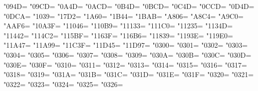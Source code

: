 
\newXeTeXintercharclass\KclassCM
\newXeTeXintercharclass\KclassVir

\XeTeXcharclass"094D=\KclassVir
\XeTeXcharclass"09CD=\KclassVir
\XeTeXcharclass"0A4D=\KclassVir
\XeTeXcharclass"0ACD=\KclassVir
\XeTeXcharclass"0B4D=\KclassVir
\XeTeXcharclass"0BCD=\KclassVir
\XeTeXcharclass"0C4D=\KclassVir
\XeTeXcharclass"0CCD=\KclassVir
\XeTeXcharclass"0D4D=\KclassVir
\XeTeXcharclass"0DCA=\KclassVir
\XeTeXcharclass"1039=\KclassVir
\XeTeXcharclass"17D2=\KclassVir
\XeTeXcharclass"1A60=\KclassVir
\XeTeXcharclass"1B44=\KclassVir
\XeTeXcharclass"1BAB=\KclassVir
\XeTeXcharclass"A806=\KclassVir
\XeTeXcharclass"A8C4=\KclassVir
\XeTeXcharclass"A9C0=\KclassVir
\XeTeXcharclass"AAF6=\KclassVir
\XeTeXcharclass"10A3F=\KclassVir
\XeTeXcharclass"11046=\KclassVir
\XeTeXcharclass"110B9=\KclassVir
\XeTeXcharclass"11133=\KclassVir
\XeTeXcharclass"111C0=\KclassVir
\XeTeXcharclass"11235=\KclassVir
\XeTeXcharclass"1134D=\KclassVir
\XeTeXcharclass"11442=\KclassVir
\XeTeXcharclass"114C2=\KclassVir
\XeTeXcharclass"115BF=\KclassVir
\XeTeXcharclass"1163F=\KclassVir
\XeTeXcharclass"116B6=\KclassVir
\XeTeXcharclass"11839=\KclassVir
\XeTeXcharclass"1193E=\KclassVir
\XeTeXcharclass"119E0=\KclassVir
\XeTeXcharclass"11A47=\KclassVir
\XeTeXcharclass"11A99=\KclassVir
\XeTeXcharclass"11C3F=\KclassVir
\XeTeXcharclass"11D45=\KclassVir
\XeTeXcharclass"11D97=\KclassVir
\XeTeXcharclass"0300=\KclassCM
\XeTeXcharclass"0301=\KclassCM
\XeTeXcharclass"0302=\KclassCM
\XeTeXcharclass"0303=\KclassCM
\XeTeXcharclass"0304=\KclassCM
\XeTeXcharclass"0305=\KclassCM
\XeTeXcharclass"0306=\KclassCM
\XeTeXcharclass"0307=\KclassCM
\XeTeXcharclass"0308=\KclassCM
\XeTeXcharclass"0309=\KclassCM
\XeTeXcharclass"030A=\KclassCM
\XeTeXcharclass"030B=\KclassCM
\XeTeXcharclass"030C=\KclassCM
\XeTeXcharclass"030D=\KclassCM
\XeTeXcharclass"030E=\KclassCM
\XeTeXcharclass"030F=\KclassCM
\XeTeXcharclass"0310=\KclassCM
\XeTeXcharclass"0311=\KclassCM
\XeTeXcharclass"0312=\KclassCM
\XeTeXcharclass"0313=\KclassCM
\XeTeXcharclass"0314=\KclassCM
\XeTeXcharclass"0315=\KclassCM
\XeTeXcharclass"0316=\KclassCM
\XeTeXcharclass"0317=\KclassCM
\XeTeXcharclass"0318=\KclassCM
\XeTeXcharclass"0319=\KclassCM
\XeTeXcharclass"031A=\KclassCM
\XeTeXcharclass"031B=\KclassCM
\XeTeXcharclass"031C=\KclassCM
\XeTeXcharclass"031D=\KclassCM
\XeTeXcharclass"031E=\KclassCM
\XeTeXcharclass"031F=\KclassCM
\XeTeXcharclass"0320=\KclassCM
\XeTeXcharclass"0321=\KclassCM
\XeTeXcharclass"0322=\KclassCM
\XeTeXcharclass"0323=\KclassCM
\XeTeXcharclass"0324=\KclassCM
\XeTeXcharclass"0325=\KclassCM
\XeTeXcharclass"0326=\KclassCM
